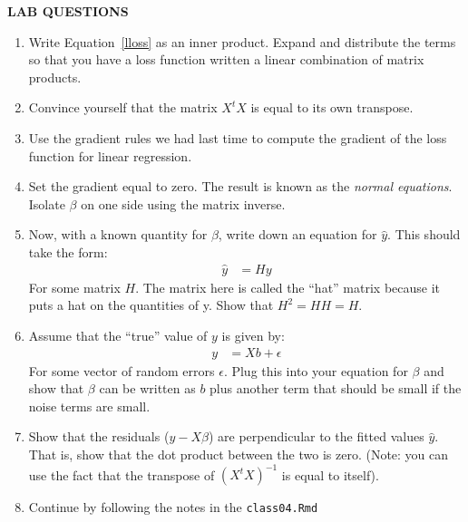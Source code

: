 \documentclass[12pt,hidelinks]{article}
\numberwithin{equation}{section}
\begin{document}
\newpage

\textbf{LAB QUESTIONS}

\vspace*{0pt}

\begin{enumerate}
\item Write Equation~\ref{lloss} as an inner product. Expand and distribute
the terms so that you have a loss function written a linear combination of
matrix products.
\item Convince yourself that the matrix $X^t X$ is equal to its own transpose.
\item Use the gradient rules we had last time to compute the gradient of the
loss function for linear regression.
\item Set the gradient equal to zero. The result is known as the
\textit{normal equations}. Isolate $\beta$ on one side using the matrix inverse.
\item Now, with a known quantity for $\beta$, write down an equation for $\widehat{y}$.
This should take the form:
\begin{align}
\widehat{y} &= H y
\end{align}
For some matrix $H$. The matrix here is called the ``hat'' matrix because it
puts a hat on the quantities of y. Show that $H^2 = HH = H$.
\item Assume that the ``true'' value of $y$ is given by:
\begin{align}
y &= X b + \epsilon
\end{align}
For some vector of random errors $\epsilon$. Plug this into your equation for
$\beta$ and show that $\beta$ can be written as $b$ plus another term that should
be small if the noise terms are small.
\item Show that the residuals ($y - X\beta$) are perpendicular to the fitted
values $\widehat{y}$. That is, show that the dot product between the two is
zero. (Note: you can use the fact that the transpose of $(X^tX)^{-1}$ is equal to itself).
\item Continue by following the notes in the \texttt{class04.Rmd}
\end{enumerate}
\end{document}
